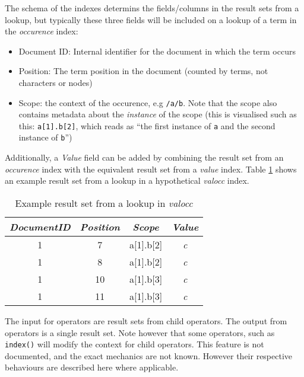 The schema of the indexes determins the fields/columns in the result sets from
a lookup, but typically these three fields will be included on a lookup of a
term in the \textit{occurence} index:
\begin{itemize}
  \item Document ID: Internal identifier for the document in which the term
  occurs
  \item Position: The term position in the document (counted by terms, not
  characters or nodes)
  \item Scope: the context of the occurence, e.g \texttt{/a/b}. Note that the
  scope also contains metadata about the \textit{instance} of the scope (this
  is visualised such as this: \texttt{a[1].b[2]}, which reads as ``the first
  instance of \texttt{a} and the second instance of \texttt{b}'')
\end{itemize}
Additionally, a \textit{Value} field can be added by combining the result set
from an \textit{occurence} index with the equivalent result set from a \textit{value}
index. Table \ref{table:method:mql:example_resultset} shows an example result
set from a lookup in a hypothetical \textit{valocc} index.

\begin{table}[!htp]
\begin{center}

\begin{tabular}{| c | c | c | c |}
\hline
\textit{DocumentID} & \textit{Position} & \textit{Scope} & \textit{Value} \\
\hline
1 & 7 & a[1].b[2] & \emph{c} \\ 
\hline
1 & 8 & a[1].b[2] & \emph{c} \\
\hline
1 & 10 & a[1].b[3] & \emph{c} \\ 
\hline
1 & 11 & a[1].b[3] & \emph{c} \\
\hline
\end{tabular}
\caption{Example result set from a lookup in \textit{valocc}}
\label{table:method:mql:example_resultset}
\end{center}
\end{table}

The input for operators are result sets from child operators. The output from
operators is a single result set. Note however that some operators, such as
\texttt{index()} will modify the context for child operators. This feature is
not documented, and the exact mechanics are not known. However their respective
behaviours are described here where applicable.

